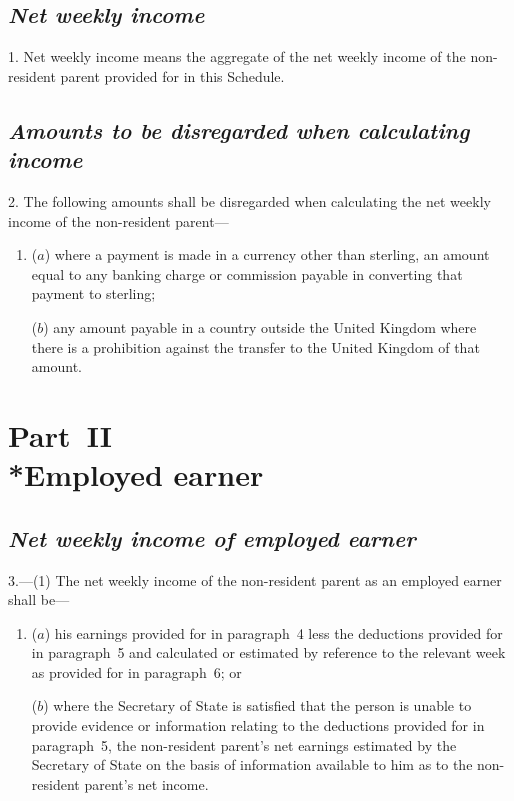 \documentclass[12pt,a4paper]{article}
\begin{document}
\renewcommand\parthead{--- Schedule~Part~I}

\subsection*{\itshape Net weekly income}

1.  Net weekly income means the aggregate of the net weekly income of the non-resident parent provided for in this Schedule.

\subsection*{\itshape Amounts to be disregarded when calculating income}

2.  The following amounts shall be disregarded when calculating the net weekly income of the non-resident parent—
\begin{enumerate}\item[]
($a$) where a payment is made in a currency other than sterling, an amount equal to any banking charge or commission payable in converting that payment to sterling;

($b$) any amount payable in a country outside the United Kingdom where there is a prohibition against the transfer to the United Kingdom of that amount.
\end{enumerate}

\section[Part~II --- Employed earner]{Part~II\\*Employed earner}

\renewcommand\parthead{--- Schedule~Part~II}

\subsection*{\itshape Net weekly income of employed earner}

3.---(1)  The net weekly income of the non-resident parent as an employed earner shall be—
\begin{enumerate}\item[]
($a$) his earnings provided for in paragraph~4 less the deductions provided for in paragraph~5 and calculated or estimated by reference to the relevant week as provided for in paragraph~6; or

($b$) where the Secretary of State is satisfied that the person is unable to provide evidence or information relating to the deductions provided for in paragraph~5, the non-resident parent’s net earnings estimated by the Secretary of State on the basis of information available to him as to the non-resident parent’s net income.
\end{enumerate}
\end{document}
